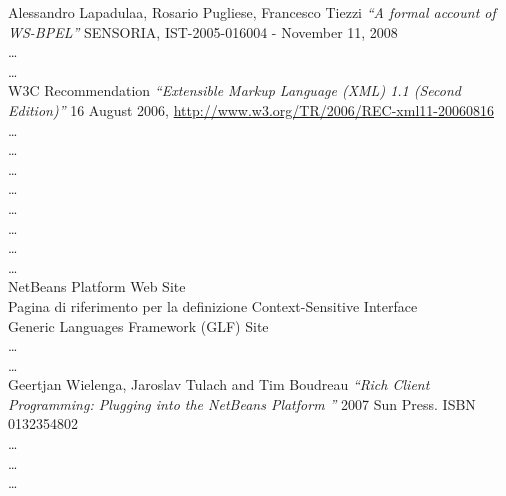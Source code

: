 \begin{thebibliography}{}

 Alessandro Lapadulaa, Rosario Pugliese, Francesco
Tiezzi \emph{``A formal account of WS-BPEL''} SENSORIA, IST-2005-016004
- November 11, 2008
\\

 \ldots
\\

 \ldots
\\

 W3C Recommendation \emph{``Extensible Markup Language (XML) 1.1
(Second Edition)''} 16 August 2006,
 \href{http://www.w3.org/TR/2006/REC-xml11-20060816}{http://www.w3.org/TR/2006/REC-xml11-20060816}
\\

 \ldots
\\

 \ldots
\\

 \ldots
\\

 \ldots
\\

 \ldots
\\

 \ldots
\\

 \ldots
\\

 \ldots
\\

 NetBeans Platform Web Site
\\

 Pagina di riferimento per la definizione
Context-Sensitive Interface
\\

 Generic Languages Framework (GLF) Site	
\\

 \ldots
\\

 \ldots
\\


 Geertjan Wielenga, Jaroslav Tulach and Tim Boudreau
\emph{``Rich Client Programming: Plugging into the NetBeans Platform ''} 2007
Sun Press. ISBN 0132354802
\\

 \ldots
\\

 \ldots
\\

 \ldots
\\

\end{thebibliography} 